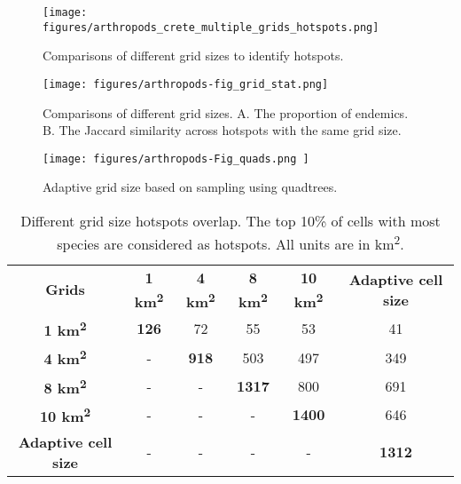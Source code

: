    \begin{figure}[htp!]
      \centering
      \texttt{[image: figures/arthropods\_crete\_multiple\_grids\_hotspots.png]}
      \caption[Comparisons of different grid sizes]{Comparisons of different grid sizes to identify hotspots.}
      \label{fig:arthropods-different-hotposts}
   \end{figure}

   \begin{figure}[htp!]
      \centering
      \texttt{[image: figures/arthropods-fig\_grid\_stat.png]}
      \caption[Comparisons of proportions of endemics across grid sizes hotspots]{Comparisons of different grid sizes. A. The proportion of endemics. B. The Jaccard similarity across hotspots with the same grid size.}
      \label{fig:arthropods-different-hotposts-stat}
   \end{figure}


   \begin{figure}[htp!]
      \centering
      \texttt{[image: figures/arthropods-Fig\_quads.png ]}
      \caption[Adaptive grid size based on sampling using quadtrees]{Adaptive grid size based on sampling using quadtrees.}
      \label{fig:arthropods-figS5}
   \end{figure}

\begin{table}[]
    \caption{Different grid size hotspots overlap. The top 10\% of cells with most species are considered as hotspots. All units are in km\textsuperscript{2}.}
\begin{tabular}{cccccc}
\textbf{Grids}              & \textbf{1 km\textsuperscript{2}} & \textbf{4 km\textsuperscript{2}} & \textbf{8 km\textsuperscript{2}} & \textbf{10 km\textsuperscript{2}} & \textbf{Adaptive cell size} \\
\textbf{1 km\textsuperscript{2}}              & \textbf{126}   & 72             & 55             & 53              & 41                          \\
\textbf{4 km\textsuperscript{2}}              & -              & \textbf{918}   & 503            & 497             & 349                         \\
\textbf{8 km\textsuperscript{2}}              & -              & -              & \textbf{1317}  & 800             & 691                         \\
\textbf{10 km\textsuperscript{2}}             & -              & -              & -              & \textbf{1400}   & 646                         \\
\textbf{Adaptive cell size} & -              & -              & -              & -               & \textbf{1312}              
\end{tabular}
\label{table:arthropods-tableS2}
\end{table}



